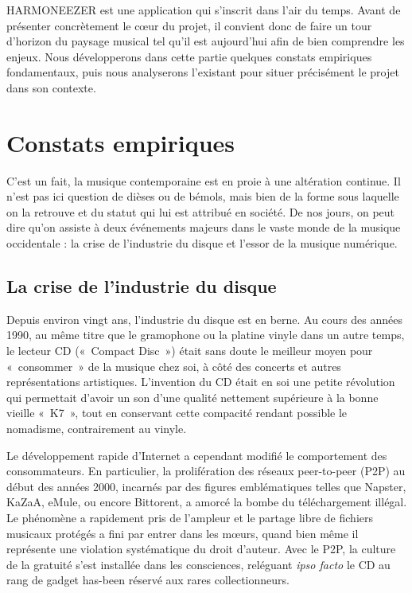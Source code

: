 \documentclass[a4paper,12pt]{article}
\begin{document}
HARMONEEZER est une application qui s'inscrit dans l'air du temps. Avant de présenter concrètement le cœur du projet, il convient donc de faire un tour d'horizon du paysage musical tel qu'il est aujourd'hui afin de bien comprendre les enjeux. Nous développerons dans cette partie quelques constats empiriques fondamentaux, puis nous analyserons l'existant pour situer précisément le projet dans son contexte.

\section{Constats empiriques}

C'est un fait, la musique contemporaine est en proie à une altération continue. Il n'est pas ici question de dièses ou de bémols, mais bien de la forme sous laquelle on la retrouve et du statut qui lui est attribué en société. De nos jours, on peut dire qu'on assiste à deux événements majeurs dans le vaste monde de la musique occidentale : la crise de l'industrie du disque et l'essor de la musique numérique.

\subsection{La crise de l'industrie du disque}

Depuis environ vingt ans, l'industrie du disque est en berne. Au cours des années 1990, au même titre que le gramophone ou la platine vinyle dans un autre temps, le lecteur CD («~Compact Disc~») était sans doute le meilleur moyen pour «~consommer~» de la musique chez soi, à côté des concerts et autres représentations artistiques. L'invention du CD était en soi une petite révolution qui permettait d'avoir un son d'une qualité nettement supérieure à la bonne vieille «~K7~», tout en conservant cette compacité rendant possible le nomadisme, contrairement au vinyle.

Le développement rapide d'Internet a cependant modifié le comportement des consommateurs. En particulier, la prolifération des réseaux peer-to-peer (P2P) au début des années 2000, incarnés par des figures emblématiques telles que Napster, KaZaA, eMule, ou encore Bittorent, a amorcé la bombe du téléchargement illégal. Le phénomène a rapidement pris de l'ampleur et le partage libre de fichiers musicaux protégés a fini par entrer dans les m\oe urs, quand bien même il représente une violation systématique du droit d'auteur. Avec le P2P, la culture de la gratuité s'est installée dans les consciences, reléguant \textit{ipso facto} le CD au rang de gadget has-been réservé aux rares collectionneurs.
\end{document}
